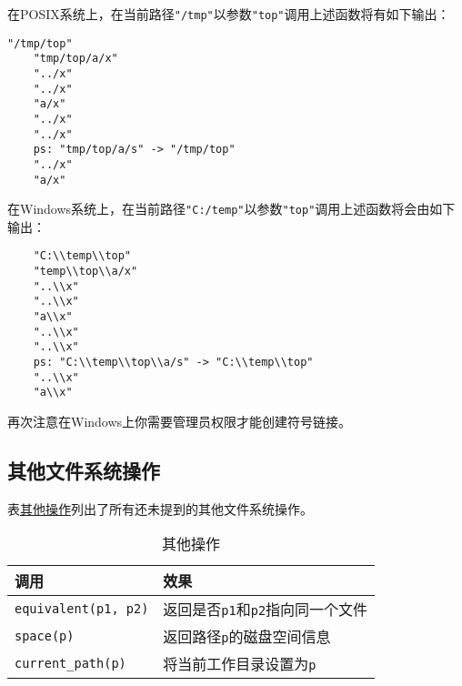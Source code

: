 在POSIX系统上，在当前路径\texttt{"/tmp"}以参数\texttt{"top"}调用上述函数将有如下输出：
\begin{lstlisting}[stringstyle=\color{black}]
    "/tmp/top"
    "tmp/top/a/x"
    "../x"
    "../x"
    "a/x"
    "../x"
    "../x"
    ps: "tmp/top/a/s" -> "/tmp/top"
    "../x"
    "a/x"
\end{lstlisting}
在Windows系统上，在当前路径\texttt{"C:/temp"}以参数\texttt{"top"}调用上述函数将会由如下输出：
\begin{lstlisting}
    "C:\\temp\\top"
    "temp\\top\\a/x"
    "..\\x"
    "..\\x"
    "a\\x"
    "..\\x"
    "..\\x"
    ps: "C:\\temp\\top\\a/s" -> "C:\\temp\\top"
    "..\\x"
    "a\\x"
\end{lstlisting}
再次注意在Windows上你需要管理员权限才能创建符号链接。

\subsection{其他文件系统操作}\label{ch20.4.6}
表\hyperref[t20.20]{其他操作}列出了所有还未提到的其他文件系统操作。
\begin{table}[ht]
    \centering
    \begin{tabular}{l|l}
        \hline
        \textbf{调用}                 & \textbf{效果}                        \\
        \hline
        \texttt{equivalent(p1, p2)} & 返回是否\texttt{p1}和\texttt{p2}指向同一个文件 \\
        \texttt{space(p)}           & 返回路径\texttt{p}的磁盘空间信息              \\
        \texttt{current\_path(p)}   & 将当前工作目录设置为\texttt{p}               \\
        \hline
    \end{tabular}
    \caption{其他操作}
    \label{t20.20}
\end{table}

